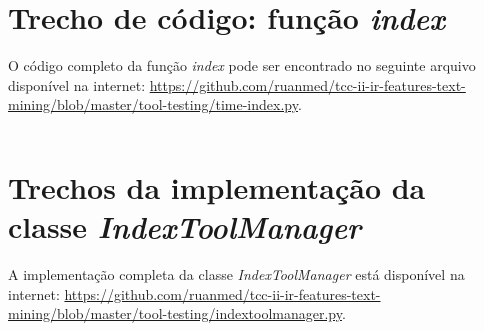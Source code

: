 \begin{apendicesenv}
    \partapendices
    
    \chapter{Trecho de código: função \textit{index}} \label{apên:função-index}
    O código completo da função \textit{index} pode ser encontrado no seguinte arquivo disponível na internet: \url{https://github.com/ruanmed/tcc-ii-ir-features-text-mining/blob/master/tool-testing/time-index.py}.
    \inputminted[bgcolor=bg, breakbytoken,
                tabsize=2, baselinestretch=1, breaklines]{python}{codes/function-index.py}
    
    \chapter{Trechos da implementação da classe \textit{IndexToolManager}} \label{apên:implementação-indextoolmanager}
    A implementação completa da classe \textit{IndexToolManager} está disponível na internet: \url{https://github.com/ruanmed/tcc-ii-ir-features-text-mining/blob/master/tool-testing/indextoolmanager.py}.
    \inputminted[bgcolor=bg, breakbytoken,
                tabsize=2, baselinestretch=1, breaklines]{python}{codes/indextoolmanager.py}

\end{apendicesenv}
    